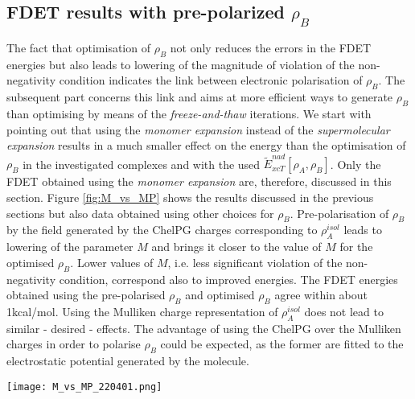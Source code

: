 \documentclass[amsmath,amssymb,preprint,aip,jcp]{revtex4-1}
\newcommand{\nr}[1]{\color{red}#1\color{black}}
\begin{document}
\subsection{FDET results with pre-polarized  $\rho_B$}

The fact that optimisation of $\rho_B$ not only reduces the errors in the FDET energies but also leads to lowering of the magnitude of violation of the non-negativity condition indicates the link between electronic polarisation of 
$\rho_B$. 
The subsequent part concerns this link and aims at more efficient ways to generate $\rho_B$ than optimising by means of the  {\it freeze-and-thaw} iterations.  
We start with pointing out that using the  {\it monomer expansion} instead of the {\it supermolecular expansion} results in a much smaller effect on the energy than the optimisation of $\rho_B$ in the investigated complexes and with the used $\tilde{E}_{xcT}^{nad}[\rho_A,\rho_B]$. 
Only the  FDET  obtained using the {\it monomer expansion} are, therefore, discussed in this section.
Figure \ref{fig:M_vs_MP} 
shows the results discussed in the previous sections but also data obtained using other choices  for $\rho_B$.
Pre-polarisation of $\rho_B$ by the field generated by the ChelPG charges corresponding to $\rho_A^{isol}$ leads to lowering of the parameter $M$ and brings it closer to the value of $M$ for the optimised $\rho_B$. 
Lower values of $M$, i.e. less significant violation of the non-negativity condition, correspond also to improved energies. 
The FDET energies obtained using the pre-polarised $\rho_B$ and optimised $\rho_B$ agree within about 1kcal/mol.
Using the  Mulliken charge representation of $\rho_A^{isol}$ does not lead to similar - desired - effects. 
The advantage of using the ChelPG  over the Mulliken charges  in order to polarise $\rho_B$ could be expected\nr{, as the former } are fitted to the electrostatic potential generated by the molecule.
\begin{figure*}
\centering
\texttt{[image: M\_vs\_MP\_220401.png]}
\caption{Integrated negative density $M$ and the FDET-MP2 interaction energy for various choices of $\rho_B$:  a) $\rho_B^{isol}$ (orange triangles), b) $\rho_B^{FAT}$ (light blue hexagons), c) $\rho_B^{pp(Mulliken)}$ (green diamonds), and d) $\rho_B^{pp(ChelPG)}$ (dark blue pentagons). Data obtained using the {\it monomer expansion}. Horizontal lies indicate the reference interaction energy.}
\label{fig:M_vs_MP}
\end{figure*}
\end{document}
